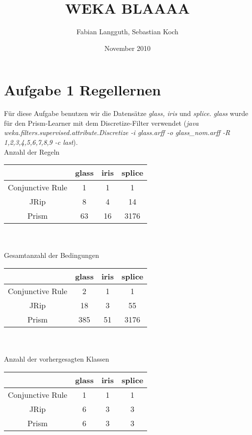 


\areaset[66pt]{415pt}{600pt}



\title{WEKA BLAAAA}
\author{Fabian Langguth, Sebastian Koch}
\date{November 2010}

\maketitle

\section{Aufgabe 1 Regellernen} %
\label{sec:aufgabe_1_regellernen}

F\"ur diese Aufgabe benutzen wir die Datens\"atze \emph{glass, iris} und \emph{splice}.
\emph{glass} wurde f\"ur den Prism-Learner mit dem Discretize-Filter verwendet (\emph{java weka.filters.supervised.attribute.Discretize -i glass.arff -o glass\_nom.arff -R 1,2,3,4,5,6,7,8,9 -c last}).\\

Anzahl der Regeln \\
\begin{tabular}{c|c|c|c}
	             & glass & iris & splice \\ \hline
Conjunctive Rule &   1   &  1   &   1    \\ \hline
JRip             &   8   &  4   &   14   \\ \hline
Prism	         &   63  &  16   &  3176    \\
\end{tabular}\\ \\

Gesamtanzahl der Bedingungen \\
\begin{tabular}{c|c|c|c}
	             & glass & iris & splice \\ \hline
Conjunctive Rule &   2   &  1   &   1    \\ \hline
JRip             &  18   &  3   &   55   \\ \hline
Prism	         &  385  & 51   &   3176   \\
\end{tabular}\\ \\

Anzahl der vorhergesagten Klassen \\
\begin{tabular}{c|c|c|c}
	             & glass & iris & splice \\ \hline
Conjunctive Rule &   1   &  1   &   1    \\ \hline
JRip             &   6   &  3   &   3    \\ \hline
Prism	         &   6   &  3   &   3    \\
\end{tabular}\\ \\


